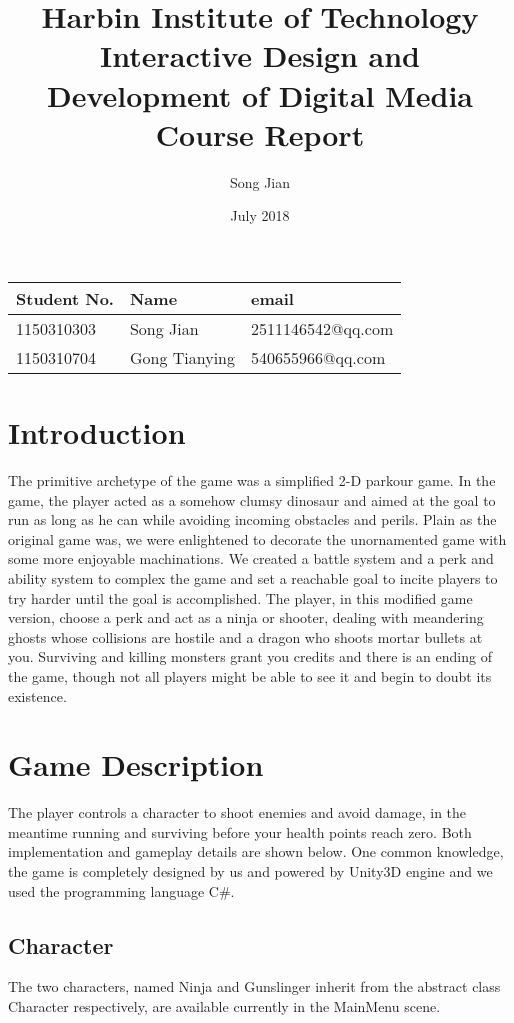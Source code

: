 \documentclass{article}
\title{Harbin Institute of Technology\\
Interactive Design and Development of Digital Media\\
Course Report}
\author{Song Jian}
\date{July 2018}
\begin{document}
\maketitle
\tableofcontents
\begin{table*}[b]
\begin{centering}
\begin{tabular}{|p{}|p{}|p{}|}
\hline
Student No.&Name&email\\
\hline
1150310303&Song Jian&2511146542@qq.com\\
\hline
1150310704&Gong Tianying&540655966@qq.com\\
\hline
\end{tabular}
\end{centering}
\end{table*}
\clearpage



\section{Introduction}
The primitive archetype of the game was a simplified 2-D parkour game. In the game, the player acted as a somehow clumsy dinosaur and aimed at the goal to run as long as he can while avoiding incoming obstacles and perils. Plain as the original game was, we were enlightened to decorate the unornamented game with some more enjoyable machinations. We created a battle system and a perk and ability system to complex the game and set a reachable goal to incite players to try harder until the goal is accomplished. The player, in this modified game version, choose a perk and act as a ninja or shooter, dealing with meandering ghosts whose collisions are hostile and a dragon who shoots mortar bullets at you. Surviving and killing monsters grant you credits and there is an ending of the game, though not all players might be able to see it and begin to doubt its existence.



\section{Game Description}
The player controls a character to shoot enemies and avoid damage, in the meantime running and surviving before your health points reach zero. Both implementation and gameplay details are shown below. One common knowledge, the game is completely designed by us and powered by Unity3D engine and we used the programming language C\#.
\subsection{Character}
The two characters, named Ninja and Gunslinger inherit from the abstract class Character respectively, are available currently in the MainMenu scene.
\end{document}
